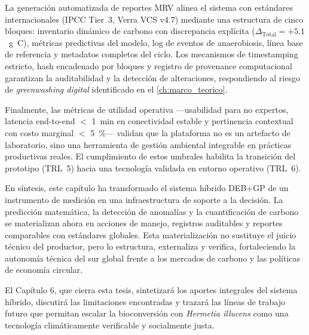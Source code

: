 La generación automatizada de reportes MRV alinea el sistema con estándares internacionales (IPCC Tier~3, Verra VCS v4.7) mediante una estructura de cinco bloques: inventario dinámico de carbono con discrepancia explícita ($\Delta_{\text{Total}} = +\num{5.1}$~g~C), métricas predictivas del modelo, log de eventos de anaerobiosis, línea base de referencia y metadatos completos del ciclo. Los mecanismos de timestamping estricto, hash encadenado por bloques y registro de provenance computacional garantizan la auditabilidad y la detección de alteraciones, respondiendo al riesgo de \textit{greenwashing digital} identificado en el \cref{ch:marco_teorico}.

Finalmente, las métricas de utilidad operativa —usabilidad para no expertos, latencia end-to-end $<$ \num{1}~min en conectividad estable y pertinencia contextual con costo marginal $<$ \num{5}~\%— validan que la plataforma no es un artefacto de laboratorio, sino una herramienta de gestión ambiental integrable en prácticas productivas reales. El cumplimiento de estos umbrales habilita la transición del prototipo (TRL~5) hacia una tecnología validada en entorno operativo (TRL~6).

En síntesis, este capítulo ha transformado el sistema híbrido DEB+GP de un instrumento de medición en una infraestructura de soporte a la decisión. La predicción matemática, la detección de anomalías y la cuantificación de carbono se materializan ahora en acciones de manejo, registros auditables y reportes comparables con estándares globales. Esta materialización no sustituye el juicio técnico del productor, pero lo estructura, externaliza y verifica, fortaleciendo la autonomía técnica del sur global frente a los mercados de carbono y las políticas de economía circular.

El Capítulo 6, que cierra esta tesis, sintetizará los aportes integrales del sistema híbrido, discutirá las limitaciones encontradas y trazará las líneas de trabajo futuro que permitan escalar la bioconversión con \textit{Hermetia illucens} como una tecnología climáticamente verificable y socialmente justa.
